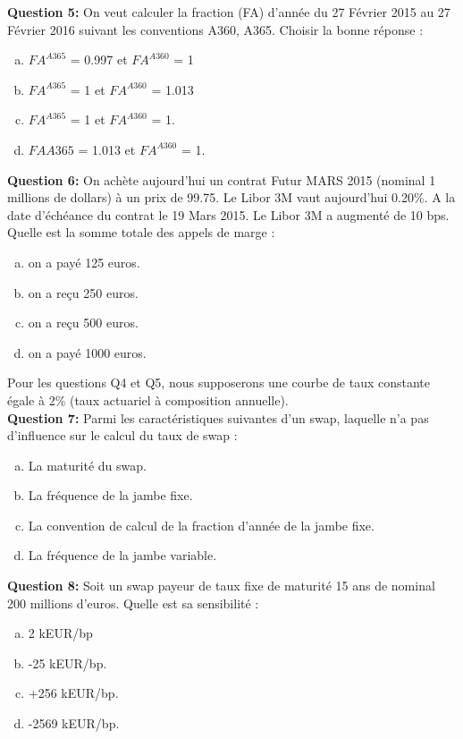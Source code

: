 \documentclass{article}
\newcommand{\indentitem}{\setlength\itemindent{25pt}}
\begin{document}
\textbf{Question 5:}
On veut calculer la fraction (FA) d’année du 27 Février 2015 au 27 Février 2016 suivant les conventions A360, A365. Choisir la bonne réponse :
\begin{enumerate}[a)]
\indentitem \item $FA^{A365}$ = 0.997 et $FA^{A360}$ = 1
\indentitem \item $FA^{A365}$ = 1 et $FA^{A360}$ = 1.013
\indentitem \item $FA^{A365}$ = 1 et $FA^{A360}$ = 1.
\indentitem \item $FAA365$ = 1.013 et $FA^{A360}$ = 1.
\end{enumerate}

\textbf{Question 6:}
On achète aujourd’hui un contrat Futur MARS 2015  (nominal 1 millions de dollars) à un prix de 99.75. Le Libor 3M vaut aujourd’hui 0.20\%. A la date d’échéance du contrat le 19 Mars 2015. Le Libor 3M a augmenté de 10 bps. Quelle est la somme totale des appels de marge :
\begin{enumerate}[a)]
\indentitem \item on a payé 125 euros.
\indentitem \item on a reçu 250 euros.
\indentitem \item on a reçu 500 euros.
\indentitem \item on a payé 1000 euros.
\end{enumerate}
Pour les questions Q4 et Q5, nous supposerons une courbe de taux constante égale à 2\% (taux actuariel à composition annuelle).\\
\textbf{Question 7:} Parmi les caractéristiques suivantes d’un swap, laquelle n’a pas d’influence sur le calcul du taux de swap :
\begin{enumerate}[a)]
\indentitem \item La maturité du swap.
\indentitem \item La fréquence de la jambe fixe.
\indentitem \item La convention de calcul de la fraction d’année de la jambe fixe.
\indentitem \item La fréquence de la jambe variable.
\end{enumerate}
\textbf{Question 8:} Soit un swap payeur de taux fixe de maturité 15 ans de nominal 200 millions d’euros. Quelle est sa sensibilité :
\begin{enumerate}[a)]
\indentitem \item 2 kEUR/bp
\indentitem \item -25 kEUR/bp.
\indentitem \item +256 kEUR/bp.
\indentitem \item -2569 kEUR/bp.
\end{enumerate}
\end{document}
